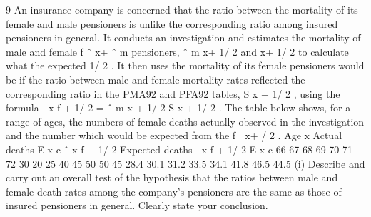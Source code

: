 \documentclass[a4paper,12pt]{article}
\begin{document}
9
An insurance company is concerned that the ratio between the mortality of its female
and male pensioners is unlike the corresponding ratio among insured pensioners in
general. It conducts an investigation and estimates the mortality of male and female
f
ˆ x+
ˆ m
pensioners, \mu  ˆ m
x+ 1/ 2 and \mu 
x+ 1/ 2 to calculate what the expected
1/ 2 . It then uses the \mu 
mortality of its female pensioners would be if the ratio between male and female
mortality rates reflected the corresponding ratio in the PMA92 and PFA92 tables,
S x + 1/ 2 , using the formula
 x f + 1/ 2 = \mu  ˆ m
\mu 
x + 1/ 2 S x + 1/ 2 .
The table below shows, for a range of ages, the numbers of female deaths actually
observed in the investigation and the number which would be expected from the
f
 x+
/ 2 .
Age
x Actual deaths
E x c \mu  ˆ x f + 1/ 2 Expected deaths
 x f + 1/ 2
E x c 
66
67
68
69
70
71
72 30
20
25
40
45
50
50
45 28.4
30.1
31.2
33.5
34.1
41.8
46.5
44.5
(i) Describe and carry out an overall test of the hypothesis that the ratios between
male and female death rates among the company’s pensioners are the same as
those of insured pensioners in general. Clearly state your conclusion.
\end{document}

